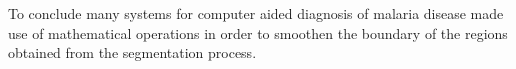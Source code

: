 \documentclass[sensors,review,submit,moreauthors,pdftex,10pt,a4paper]{mdpi}
\begin{document}
To conclude many systems for computer aided diagnosis of malaria disease made use of mathematical operations in order to smoothen the boundary of the regions obtained from the segmentation process.


%
\end{document}
